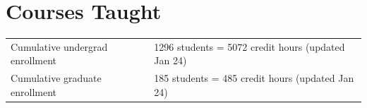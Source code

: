 \documentclass{article}
\begin{document}


%


%




\section*{Courses Taught}

\begin{tabular}{p{}p{}}
Cumulative undergrad enrollment & 1296 students = 5072 credit hours (updated Jan 24)\\[4pt]
Cumulative graduate enrollment &  185 students = 485 credit hours (updated Jan 24)
\end{tabular}
\end{document}
